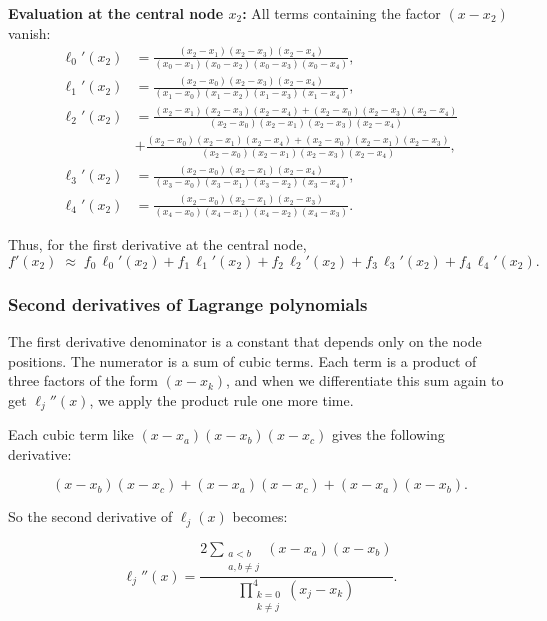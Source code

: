 \textbf{Evaluation at the central node \(x_2\):}
All terms containing the factor \((x-x_2)\) vanish:
\[
\begin{aligned}
\ell_0'(x_2)&=\frac{(x_2-x_1)(x_2-x_3)(x_2-x_4)}
                   {(x_0-x_1)(x_0-x_2)(x_0-x_3)(x_0-x_4)},\\[2.0ex]
\ell_1'(x_2)&=\frac{(x_2-x_0)(x_2-x_3)(x_2-x_4)}
                   {(x_1-x_0)(x_1-x_2)(x_1-x_3)(x_1-x_4)},\\[2.0ex]
\ell_2'(x_2) &= \frac{(x_2 - x_1)(x_2 - x_3)(x_2 - x_4) 
                + (x_2 - x_0)(x_2 - x_3)(x_2 - x_4) }{(x_2 - x_0)(x_2 - x_1)(x_2 - x_3)(x_2 - x_4)} \\
       & + \frac{(x_2 - x_0)(x_2 - x_1)(x_2 - x_4) 
                + (x_2 - x_0)(x_2 - x_1)(x_2 - x_3)}{(x_2 - x_0)(x_2 - x_1)(x_2 - x_3)(x_2 - x_4)},\\[2.0ex]
\ell_3'(x_2)&=\frac{(x_2-x_0)(x_2-x_1)(x_2-x_4)}
                   {(x_3-x_0)(x_3-x_1)(x_3-x_2)(x_3-x_4)},\\[2.0ex]
\ell_4'(x_2)&=\frac{(x_2-x_0)(x_2-x_1)(x_2-x_3)}
                   {(x_4-x_0)(x_4-x_1)(x_4-x_2)(x_4-x_3)}.
\end{aligned}
\]

Thus, for the first derivative at the central node,
\[
f'(x_2)\;\approx\;f_0\,\ell_0'(x_2)+f_1\,\ell_1'(x_2)
              +f_2\,\ell_2'(x_2)+f_3\,\ell_3'(x_2)+f_4\,\ell_4'(x_2).
\]

\subsubsection{Second derivatives of Lagrange polynomials}

The first derivative denominator is a constant that depends only on the node positions. The numerator is a sum of cubic terms. Each term is a product of three factors of the form \((x - x_k)\), and when we differentiate this sum again to get \(\ell_j''(x)\), we apply the product rule one more time.

Each cubic term like \((x - x_a)(x - x_b)(x - x_c)\) gives the following derivative:

\[
(x - x_b)(x - x_c) + (x - x_a)(x - x_c) + (x - x_a)(x - x_b).
\]

So the second derivative of \(\ell_j(x)\) becomes:

\[
\ell_j''(x) =
\frac{
\displaystyle 2 \sum_{\substack{a < b \\ a,b \neq j}} (x - x_a)(x - x_b)
}{
\displaystyle\prod_{\substack{k=0\\ k \neq j}}^4 (x_j - x_k)
}.
\]

